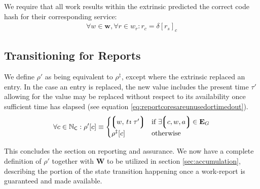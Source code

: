 We require that all work results within the extrinsic predicted the correct code hash for their corresponding service:
\begin{align}\label{eq:reportcodesarecorrect}
  \forall w \in \mathbf{w}, \forall r \in w_r : r_c = \delta[r_s]_c
\end{align}









\subsection{Transitioning for Reports}

We define $\rho'$ as being equivalent to $\rho^\ddagger$, except where the extrinsic replaced an entry. In the case an entry is replaced, the new value includes the present time $\tau'$ allowing for the value may be replaced without respect to its availability once sufficient time has elapsed (see equation \ref{eq:reportcoresareunusedortimedout}).
\begin{equation}
    \forall c \in \N_\mathsf{C} : \rho'[c] \equiv \begin{cases}
      \tup{w\ts\is{t}{\tau'}} &\when \exists \tup{c, w, a} \in \xtguarantees \\
      \rho^\ddagger[c] &\otherwise
    \end{cases}
\end{equation}

This concludes the section on reporting and assurance. We now have a complete definition of $\rho'$ together with $\mathbf{W}$ to be utilized in section \ref{sec:accumulation}, describing the portion of the state transition happening once a work-report is guaranteed and made available.
